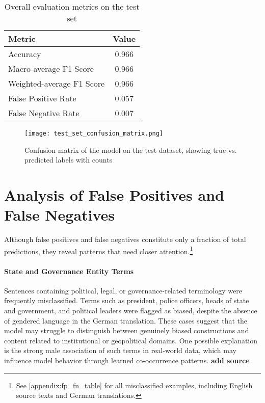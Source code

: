         \vspace{0.8em}
        \begin{table}[H]
            \centering
            \begin{tabular}{lc}
            \toprule
            \textbf{Metric} & \textbf{Value} \\
            \midrule
            Accuracy & 0.966 \\
            Macro-average F1 Score & 0.966 \\
            Weighted-average F1 Score & 0.966 \\
            False Positive Rate & 0.057 \\
            False Negative Rate & 0.007 \\
            \bottomrule
            \end{tabular}
            \caption{Overall evaluation metrics on the test set}
        \end{table}

        \begin{figure}[ht]
            \centering
            \texttt{[image: test\_set\_confusion\_matrix.png]}
            \caption[Confusion matrix on the test dataset]{Confusion matrix of the model on the test dataset, showing true vs. predicted labels with counts}
            \label{fig:test_confusion_matrix}
        \end{figure}


\section{Analysis of False Positives and False Negatives}

Although false positives and false negatives constitute only a fraction of total predictions, they reveal patterns that need closer attention.\footnote{See \autoref{appendix:fp_fn_table} for all misclassified examples, including English source texts and German translations.}

\paragraph{State and Governance Entity Terms}

Sentences containing political, legal, or governance-related terminology were frequently misclassified. Terms such as president, police officers, heads of state and government, and political leaders were flagged as biased, despite the absence of gendered language in the German translation. These cases suggest that the model may struggle to distinguish between genuinely biased constructions and content related to institutional or geopolitical domains. One possible explanation is the strong male association of such terms in real-world data, which may influence model behavior through learned co-occurrence patterns. \textbf{add source}

